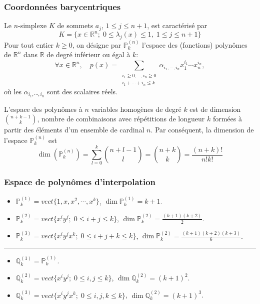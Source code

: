\documentclass{beamer}
\begin{document}

\begin{frame}
\frametitle{Coordonnées barycentriques}

Le $n$-simplexe $K$ de sommets $a_j$, $1\leq j\leq n+1$, est caractérisé par
\begin{equation}
K=\{x\in \mathbb{R}^n;\;0\leq \lambda_j(x) \leq 1,\; 1\leq j\leq n+1\}
\end{equation}
Pour tout entier   $k\geq 0$,  on désigne par $\mathbb{P}_k^{(n)}$ l'espace des (fonctions) polynômes de $\mathbb{R}^n$ dans $\mathbb{R}$ de degré inférieur ou égal à $k$:
\begin{equation}
\forall x\in\mathbb{R}^n,\quad p(x)=\sum_{\begin{array}{c} i_1\geq 0,\cdots ,i_n\geq 0\\i_1+\cdots +i_n\leq k \end{array}}\alpha_{i_1,\cdots,i_n}x_1^{i_1}\cdots x_n^{i_n},
\end{equation}
où les $\alpha_{i_1,\cdots,i_n}$  sont des scalaires réels.

  L'espace des polynômes à $n$ variables homogènes de degré $k$ est de dimension 
$\binom {n+k-1}k$, nombre de combinaisons avec répétitions de longueur $k$ formées à partir des éléments d'un ensemble de cardinal $n$. Par conséquent, la dimension de l'espace $\mathbb{P}_k^{(n)}$ est
\begin{equation}
\dim(\mathbb{P}_k^{(n)})=\sum_{l=0}^k \binom {n+l-1}l=\binom {n+k}k=\frac{(n+k)!}{n!k!}
\end{equation}
\end{frame}


\begin{frame}
\frametitle{Espace de polynômes d'interpolation}

\begin{itemize}
\item $\mathbb{P}_k^{(1)}=vect\{1,x,x^2,\cdots,x^k\}$, $\dim \mathbb{P}_k^{(1)}=k+1$.
\item $\mathbb{P}_k^{(2)}=vect\{x^iy^j;\; 0\leq i+j \leq k\}$, $\dim \mathbb{P}_k^{(2)}=\frac{(k+1)(k+2)}{2}$.
\item $\mathbb{P}_k^{(3)}=vect\{x^iy^jx^k;\; 0\leq i+j+k \leq k\}$, $\dim \mathbb{P}_k^{(2)}=\frac{(k+1)(k+2)(k+3)}{6}$.
\end{itemize}


\hrule


\begin{itemize}
\item $\mathbb{Q}_k^{(1)}=\mathbb{P}_k^{(1)}$.
\item $\mathbb{Q}_k^{(2)}=vect\{x^iy^j;\; 0\leq i,j \leq k\}$, $\dim \mathbb{Q}_k^{(2)}=(k+1)^2$.
\item $\mathbb{Q}_k^{(3)}=vect\{x^iy^jx^k;\; 0\leq i,j,k \leq k\}$, $\dim \mathbb{Q}_k^{(2)}=(k+1)^3$.
\end{itemize}
\end{frame}
\end{document}
